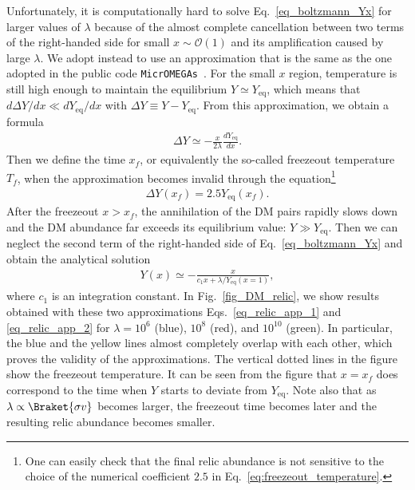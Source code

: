 \documentclass[12pt,twoside,book]{article}
\begin{document}
Unfortunately, it is computationally hard to solve Eq.~\eqref{eq_boltzmann_Yx} for larger values of $\lambda$ because of the almost complete cancellation between two terms of the right-handed side for small $x\sim \mathcal{O}(1)$ and its amplification caused by large $\lambda$.
We adopt instead to use an approximation that is the same as the one adopted in the public code \texttt{MicrOMEGAs}~\cite{Belanger:2001fz, Belanger:2018mqt}.
For the small $x$ region, temperature is still high enough to maintain the equilibrium $Y \simeq Y_{\mathrm{eq}}$, which means that $d \Delta Y / d x \ll d Y_{\mathrm{eq}} / d x$ with $\Delta Y \equiv Y - Y_{\mathrm{eq}}$.
From this approximation, we obtain a formula
\begin{align}
  \Delta Y \simeq -\frac{x}{2 \lambda} \frac{d Y_{\mathrm{eq}}}{d x}.\label{eq_relic_app_1}
\end{align}
Then we define the time $x_f$, or equivalently the so-called freezeout temperature $T_f$, when the approximation becomes invalid through the equation\footnote{
  One can easily check that the final relic abundance is not sensitive to the choice of the numerical coefficient $2.5$ in Eq.~\eqref{eq:freezeout_temperature}.
}
\begin{align}
  \Delta Y (x_f) = 2.5 Y_{\mathrm{eq}} (x_f).
  \label{eq:freezeout_temperature}
\end{align}
After the freezeout $x > x_f$, the annihilation of the DM pairs rapidly slows down and the DM abundance far exceeds its equilibrium value: $Y \gg Y_{\mathrm{eq}}$.
Then we can neglect the second term of the right-handed side of Eq.~\eqref{eq_boltzmann_Yx} and obtain the analytical solution
\begin{align}
  Y(x) \simeq - \frac{x}{c_1 x + \lambda / Y_{\mathrm{eq}} (x=1)},\label{eq_relic_app_2}
\end{align}
where $c_1$ is an integration constant.
In Fig.~\ref{fig_DM_relic}, we show results obtained with these two approximations Eqs.~\eqref{eq_relic_app_1} and \eqref{eq_relic_app_2} for $\lambda = 10^6$ (blue), $10^8$ (red), and $10^{10}$ (green).
In particular, the blue and the yellow lines almost completely overlap with each other, which proves the validity of the approximations.
The vertical dotted lines in the figure show the freezeout temperature.
It can be seen from the figure that $x = x_f$ does correspond to the time when $Y$ starts to deviate from $Y_{\mathrm{eq}}$.
Note also that as $\lambda \propto \Braket{\sigma v}$ becomes larger, the freezeout time becomes later and the resulting relic abundance becomes smaller.
\end{document}
